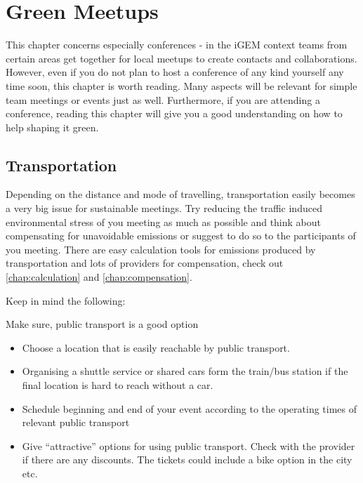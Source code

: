 
\chapter{Green Meetups}\label{chap:meetup}
This chapter concerns especially conferences - in the iGEM context teams from certain areas get together for local meetups to create contacts and collaborations. However, even if you do not plan to host a conference of any kind yourself any time soon, this chapter is worth reading. Many aspects will be relevant for simple team meetings or events just as well. Furthermore, if you are attending a conference, reading this chapter will give you a good understanding on how to help shaping it green.

\section{Transportation}
Depending on the distance and mode of travelling, transportation easily becomes a very big issue for sustainable meetings. Try reducing the traffic induced environmental stress of you meeting as much as possible and think about compensating for unavoidable emissions or suggest to do so to the participants of you meeting. There are easy calculation tools for emissions produced by transportation and lots of providers for compensation, check out \cref{chap:calculation} and \cref{chap:compensation}.

Keep in mind the following:

\begin{suggest}{Make sure, public transport is a good option}
	\vspace{-2\topsep}
	\begin{itemize}
		\item Choose a location that is easily reachable by public transport.
		\item Organising a shuttle service or shared cars form the train/bus station if the final location is hard to reach without a car.
		\item Schedule beginning and end of your event according to the operating times of relevant public transport
		\item Give ``attractive'' options for using public transport. Check with the provider if there are any discounts. The tickets could include a bike option in the city etc.
	\end{itemize}
\end{suggest}

